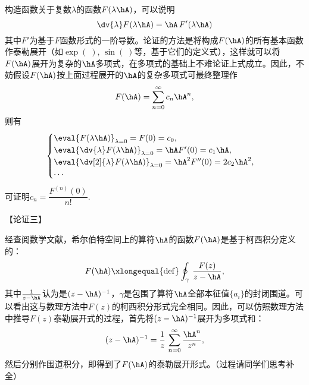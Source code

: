 \begin{enumerate}[label=2.\Alph*]
构造函数关于复数$\lambda$的函数$F(\lambda\hA)$，可以说明
\[\dv{\lambda}F(\lambda\hA) = \hA\,F'(\lambda\hA)\]
其中$F'$为基于$F$函数形式的一阶导数。论证的方法是将构成$F(\hA)$的所有基本函数作泰勒展开（如$\exp(\;),\,\sin(\;)$等，基于它们的定义式），这样就可以将$F(\hA)$展开为复杂的$\hA$多项式，在多项式的基础上不难论证上式成立。因此，不妨假设$F(\hA)$按上面过程展开的$\hA$的复杂多项式可最终整理作
\[F(\hA) = \sum_{n=0}^\infty c_n \hA^n,\]
则有
\[
\begin{cases}
\eval{F(\lambda \hA)}_{\lambda=0} = F(0) =  c_0,\\
\eval{\dv{\lambda}F(\lambda \hA)}_{\lambda=0} = \hA F'(0) = c_1\hA,\\
\eval{\dv[2]{\lambda}F(\lambda \hA)}_{\lambda=0} = \hA^2 F''(0) = 2c_2\hA^2,\\
\cdots
\end{cases}
\]
可证明$c_n = \dfrac{F^{(n)}(0)}{n!}$.

【论证三】

经查阅数学文献，希尔伯特空间上的算符$\hA$的函数$F(\hA)$是基于柯西积分定义的：
\[F(\hA)\xlongequal{\mathrm{def}} \oint_\gamma \,\frac{F(z)}{z-\hA},\]
其中$ \frac{1}{z-\hA}$认为是$(z-\hA)^{-1}$，$\gamma$是包围了算符$\hA$全部本征值$\{a_i\}$的封闭围道。可以看出这与数理方法中$F(z)$的柯西积分形式完全相同。因此，可以仿照数理方法中推导$F(z)$泰勒展开式的过程，首先将$(z-\hA)^{-1}$展开为多项式和：
\[(z-\hA)^{-1} = \frac{1}{z}\,\sum_{n=0}^{\infty}\frac{\hA^n}{z^n},\]
然后分别作围道积分，即得到了$F(\hA)$的泰勒展开形式。（过程请同学们思考补全）

\end{enumerate}